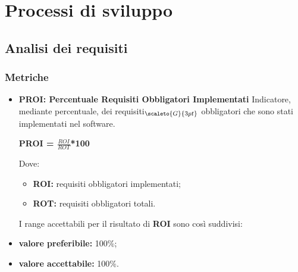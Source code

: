 \section{Processi di sviluppo}\label{QualitàDelProcessoProcessiDiSviluppo}
\subsection{Analisi dei requisiti}\label{ProcessiDiSviluppoAnalisiDeiRequisiti}
\subsubsection{Metriche}\label{MetricheProcessiDiSviluppo}
\begin{itemize}
	\item[] \textbf{PROI: Percentuale Requisiti Obbligatori Implementati}
	Indicatore, mediante percentuale, dei requisiti$_{\scaleto{G}{3pt}}$ obbligatori che sono stati implementati nel software.
	\begin{center}
		\textbf{PROI = $\frac{ROI}{ROT}$*100}
	\end{center}
	Dove:
	\begin{itemize}
		\item \textbf{ROI:} requisiti obbligatori implementati;
		\item \textbf{ROT:} requisiti obbligatori totali.
	\end{itemize}
	I range accettabili per il risultato di \textbf{ROI} sono così suddivisi:
	\item \textbf{valore preferibile:} 100\%;
	\item \textbf{valore accettabile:} 100\%.
\end{itemize}
